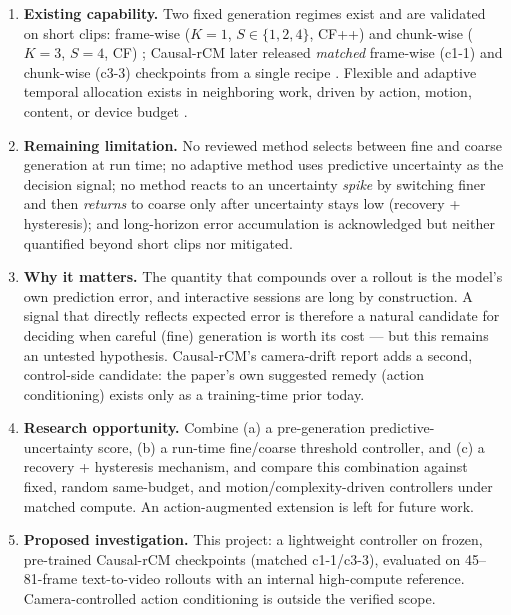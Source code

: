 \documentclass[11pt,a4paper]{article}
\begin{document}
\begin{enumerate}[leftmargin=2.2em, itemsep=2pt]
\item \textbf{Existing capability.} Two fixed generation regimes exist and are validated on short clips: frame-wise ($K=1$, $S\in\{1,2,4\}$, CF++) and chunk-wise ($K=3$, $S=4$, CF) \parencite{zhaoCausalForcingScalable2026a,zhuCausalForcingAutoregressive2026a}; Causal-rCM later released \emph{matched} frame-wise (c1-1) and chunk-wise (c3-3) checkpoints from a single recipe \parencite{zhengCausalrCMUnifiedTeacherForcing2026}. Flexible and adaptive temporal allocation exists in neighboring work, driven by action, motion, content, or device budget \parencite{shangLongScapeAdvancingLongHorizon2025,maFlexForcingUnifiedAutoregressive2026,xiongEVATokAdaptiveLength2026,liLearningAdaptiveTemporally2025,xuMotionAwareCachingEfficient2026}.
\item \textbf{Remaining limitation.} No reviewed method selects between fine and coarse generation at run time; no adaptive method uses predictive uncertainty as the decision signal; no method reacts to an uncertainty \emph{spike} by switching finer and then \emph{returns} to coarse only after uncertainty stays low (recovery + hysteresis); and long-horizon error accumulation is acknowledged \parencite{zhaoCausalForcingScalable2026a,zhengCausalrCMUnifiedTeacherForcing2026} but neither quantified beyond short clips nor mitigated.
\item \textbf{Why it matters.} The quantity that compounds over a rollout is the model's own prediction error, and interactive sessions are long by construction. A signal that directly reflects expected error is therefore a natural candidate for deciding when careful (fine) generation is worth its cost --- but this remains an untested hypothesis. Causal-rCM's camera-drift report adds a second, control-side candidate: the paper's own suggested remedy (action conditioning) exists only as a training-time prior today.
\item \textbf{Research opportunity.} Combine (a) a pre-generation predictive-uncertainty score, (b) a run-time fine/coarse threshold controller, and (c) a recovery + hysteresis mechanism, and compare this combination against fixed, random same-budget, and motion/complexity-driven controllers under matched compute. An action-augmented extension is left for future work.
\item \textbf{Proposed investigation.} This project: a lightweight controller on frozen, pre-trained Causal-rCM checkpoints (matched c1-1/c3-3), evaluated on 45--81-frame text-to-video rollouts with an internal high-compute reference. Camera-controlled action conditioning is outside the verified scope.
\end{enumerate}
\end{document}
